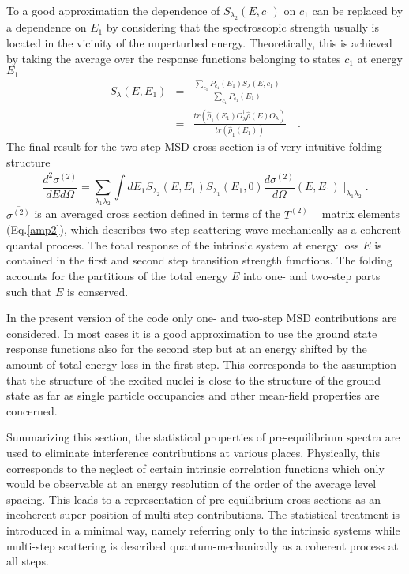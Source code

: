 \documentclass[twocolumn,amsmath,amssymb,10pt,groupedaddress,letter]{revtex4}
\begin{document}
To a good approximation the dependence of $S_{\lambda_{2}}(E,c_{1})$
on $c_{1}$ can be replaced by a dependence on $E_{1}$ by considering
that the spectroscopic strength usually is located in the vicinity
of the unperturbed energy. Theoretically, this is achieved by taking
the average over the response functions belonging to states $c_{1}$
at energy $E_{1}$
\begin{eqnarray}
S_{\lambda}(E,E_{1}) & = & \frac{\sum_{c_{1}}{P_{c_{1}}(E_{1})S_{\lambda}(E,c_{1})}}{\sum_{c_{1}}{P_{c_{1}}(E_{1})}}\nonumber \\
 & = & \frac{tr(\hat{\rho}_{1}(E_{1})O_{\lambda}^{\dag}\hat{\rho}(E)O_{\lambda})}{tr(\hat{\rho}_{1}(E_{1}))}\quad.\label{slave}
\end{eqnarray}
\noindent The final result for the two-step MSD cross section is
of very intuitive folding structure
\begin{equation}
\frac{d^{2}\sigma^{(2)}}{dEd\Omega}=\sum_{\lambda_{1}\lambda_{2}}{\int dE_{1}S_{\lambda_{2}}(E,E_{1})S_{\lambda_{1}}(E_{1},0)\overline{\frac{d\sigma^{(2)}}{d\Omega}}(E,E_{1})\mid_{\lambda_{1}\lambda_{2}}}.
\label{sigma2}
\end{equation}
\noindent $\overline{\sigma^{(2)}}$ is an averaged cross section defined in
terms of the $T^{(2)}-$matrix elements (Eq.\ref{amp2}), which describes
two-step scattering wave-mechanically as a coherent quantal process.
The total response of the intrinsic system at energy loss $E$ is
contained in the first and second step transition strength functions.
The folding accounts for the partitions of the total energy $E$ into
one- and two-step parts such that $E$ is conserved.

In the present version of the code only one- and two-step MSD
contributions are considered. In most cases it is a good approximation
to use the ground state response functions also for the second step
but at an energy shifted by the amount of total energy loss in the
first step. This corresponds to the assumption that the structure
of the excited nuclei is close to the structure of the ground state
as far as single particle occupancies and other mean-field properties
are concerned.

Summarizing this section, the statistical properties of pre-equilibrium
spectra are used to eliminate interference contributions at various
places. Physically, this corresponds to the neglect of certain intrinsic
correlation functions which only would be observable at an energy
resolution of the order of the average level spacing. This leads to
a representation of pre-equilibrium cross sections as an incoherent
super-position of multi-step contributions. The statistical treatment
is introduced in a minimal way, namely referring only to the intrinsic
systems while multi-step scattering is described quantum-mechanically
as a coherent process at all steps.
\end{document}
